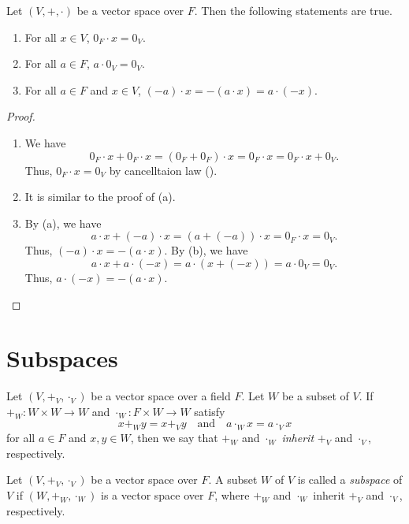 \begin{theorem}\label{thm:vector-space-multiplication}
  Let $(V, +, \cdot)$ be a vector space over $F$.
  Then the following statements are true.
  \begin{enumerate}
    \item For all $x \in V$, $0_F \cdot x = 0_V$.
    \item For all $a \in F$, $a \cdot 0_V = 0_V$.
    \item For all $a \in F$ and $x \in V$,
      $(-a) \cdot x = -(a \cdot x) = a \cdot (-x)$.
  \end{enumerate}
\end{theorem}
\begin{proof} \leavevmode
  \begin{enumerate}
    \item We have
      $$
      0_F \cdot x + 0_F \cdot x
      = (0_F + 0_F) \cdot x
      = 0_F \cdot x
      = 0_F \cdot x + 0_V.
      $$
      Thus, $0_F \cdot x = 0_V$ by cancelltaion law
      ().
    \item It is similar to the proof of (a).
    \item By (a), we have
      $$
      a \cdot x + (-a) \cdot x
      = (a + (-a)) \cdot x
      = 0_F \cdot x
      = 0_V.
      $$
      Thus, $(-a) \cdot x = -(a \cdot x)$.
      By (b), we have
      $$
      a \cdot x + a \cdot (-x)
      = a \cdot (x + (-x))
      = a \cdot 0_V
      = 0_V.
      $$
      Thus, $a \cdot (-x) = -(a \cdot x)$. \qedhere
  \end{enumerate}
\end{proof}

\section{Subspaces}
\begin{definition}\label{def:inheritance}
  Let $(V, +_V, \cdot_V)$ be a vector space over a field $F$.
  Let $W$ be a subset of $V$.
  If $+_W: W \times W \to W$ and $\cdot_W: F \times W \to W$
  satisfy
  \begin{equation*}
    x +_W y = x +_V y
      \quad \text{and}
      \quad a \cdot_W x = a \cdot_V x
  \end{equation*}
  for all $a \in F$ and $x, y \in W$, then we say that $+_W$ and $\cdot_W$
  \emph{inherit} $+_V$ and $\cdot_V$, respectively.
\end{definition}

\begin{definition}\label{def:subspace}
  Let $(V, +_V, \cdot_V)$ be a vector space over $F$.
  A subset $W$ of $V$ is called a \emph{subspace} of $V$ if
  $(W, +_W, \cdot_W)$ is a vector space over $F$, where $+_W$ and $\cdot_W$
  inherit $+_V$ and $\cdot_V$, respectively.
\end{definition}

